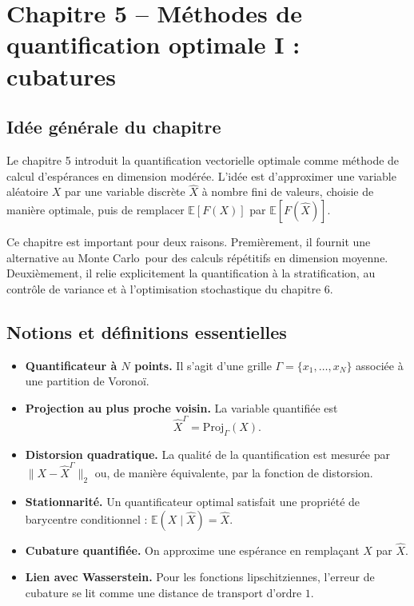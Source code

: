 \documentclass[11pt,a4paper]{article}
\newcommand{\E}{\mathbb{E}}
\newcommand{\mc}{Monte Carlo}
\begin{document}
\section{Chapitre 5 -- Méthodes de quantification optimale I : cubatures}

\subsection{Idée générale du chapitre}

Le chapitre 5 introduit la quantification vectorielle optimale comme méthode de calcul d'espérances en dimension modérée. L'idée est d'approximer une variable aléatoire $X$ par une variable discrète $\hat X$ à nombre fini de valeurs, choisie de manière optimale, puis de remplacer $\E[F(X)]$ par $\E[F(\hat X)]$.

Ce chapitre est important pour deux raisons. Premièrement, il fournit une alternative au \mc\ pour des calculs répétitifs en dimension moyenne. Deuxièmement, il relie explicitement la quantification à la stratification, au contrôle de variance et à l'optimisation stochastique du chapitre 6.

\subsection{Notions et définitions essentielles}

\begin{itemize}
  \item \textbf{Quantificateur à $N$ points.} Il s'agit d'une grille $\Gamma=\{x_1,\dots,x_N\}$ associée à une partition de Voronoï.
  \item \textbf{Projection au plus proche voisin.} La variable quantifiée est
  \[
    \hat X^\Gamma=\mathrm{Proj}_\Gamma(X).
  \]
  \item \textbf{Distorsion quadratique.} La qualité de la quantification est mesurée par $\|X-\hat X^\Gamma\|_2$ ou, de manière équivalente, par la fonction de distorsion.
  \item \textbf{Stationnarité.} Un quantificateur optimal satisfait une propriété de barycentre conditionnel : $\E(X\mid \hat X)=\hat X$.
  \item \textbf{Cubature quantifiée.} On approxime une espérance en remplaçant $X$ par $\hat X$.
  \item \textbf{Lien avec Wasserstein.} Pour les fonctions lipschitziennes, l'erreur de cubature se lit comme une distance de transport d'ordre $1$.
\end{itemize}
\end{document}
